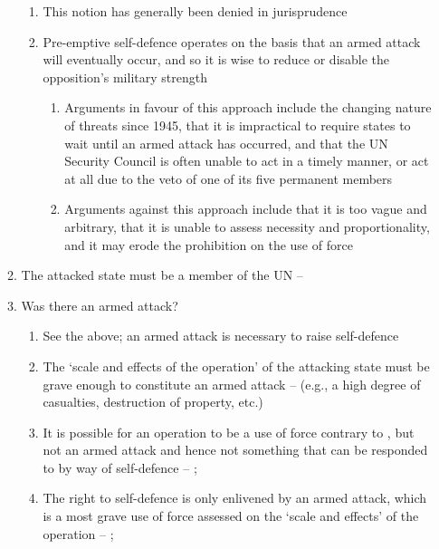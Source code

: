 \begin{enumerate}
\begin{enumerate}
\begin{enumerate}
            \item This notion has generally been denied in jurisprudence
            \item Pre-emptive self-defence operates on the basis that an armed attack will eventually occur, and so it is wise to reduce or disable the opposition's military strength
            \begin{enumerate}
                \item Arguments in favour of this approach include the changing nature of threats since 1945, that it is impractical to require states to wait until an armed attack has occurred, and that the UN Security Council is often unable to act in a timely manner, or act at all due to the veto of one of its five permanent members
                \item Arguments against this approach include that it is too vague and arbitrary, that it is unable to assess necessity and proportionality, and it may erode the prohibition on the use of force
            \end{enumerate}
        \end{enumerate}
        \item The attacked state must be a member of the UN -- 
        \item Was there an armed attack?
        \begin{enumerate}
            \item See the above; an armed attack is necessary to raise self-defence
            \item The `scale and effects of the operation' of the attacking state must be grave enough to constitute an armed attack --  (e.g., a high degree of casualties, destruction of property, etc.)
            \item It is possible for an operation to be a use of force contrary to , but not an armed attack and hence not something that can be responded to by way of self-defence -- ; 
            \item The right to self-defence is only enlivened by an armed attack, which is a most grave use of force assessed on the `scale and effects' of the operation -- ; 
        \end{enumerate}

\end{enumerate}
\end{enumerate}
